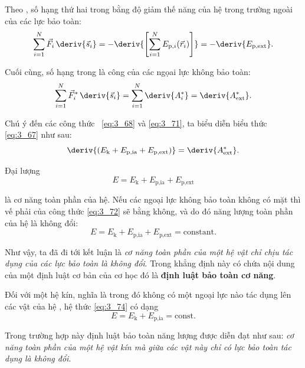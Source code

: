 \noindent
Theo , số hạng thứ hai trong  bằng độ giảm thế năng của hệ trong trường ngoài của các lực bảo toàn: 
\begin{equation}\label{eq:3_70}
\sum_{i=1}^{N}\vec{F}_i\,\deriv{\vec{s}_i} = -\deriv{\left[\sum_{i=1}^{N}E_{\text{p},i}(\vec{r}_i)\right]} = -\deriv{E_{\text{p,ext}}}.
\end{equation}

\noindent
Cuối cùng, số hạng trong   là công của các ngọai lực không bảo toàn:
\begin{equation}\label{eq:3_71}
\sum_{i=1}^{N}\vec{F}_i^*\,\deriv{\vec{s}_i} = \sum_{i=1}^{N} \deriv{A_i^*} = \deriv{A^*_{\text{ext}}}.
\end{equation}

\noindent
Chú ý đến các công thức ~\eqref{eq:3_68} và \eqref{eq:3_71}, ta biểu diễn biểu thức \eqref{eq:3_67} như sau: 
\begin{equation}\label{eq:3_72}
\deriv{(E_{\text{k}} + E_{\text{p,ia}} + E_{\text{p,ext}})} = \deriv{A^*_{\text{ext}}}.
\end{equation}

Đại lượng
\begin{equation}\label{eq:3_73}
E = E_{\text{k}} + E_{\text{p,ia}} + E_{\text{p,ext}}
\end{equation}

\noindent
là cơ năng toàn phần của hệ. Nếu các ngoại lực không bảo toàn không có mặt thì vế phải của công thức \eqref{eq:3_72} sẽ bằng không, và do đó năng lượng toàn phần của hệ là không đổi: 
\begin{equation}\label{eq:3_74}
E = E_{\text{k}} + E_{\text{p,ia}} + E_{\text{p,ext}} = \text{constant}.
\end{equation}

\noindent
Như vậy, ta đã đi tới kết luận là 
 \textit{cơ năng toàn phần của một hệ vật chỉ chịu tác dụng của các lực bảo toàn là không đổi}. Trong khẳng định này có chứa nội dung của một định luật cơ bản của cơ học đó là \textbf{định luật bảo toàn cơ năng}.

Đối với một hệ kín, nghĩa là trong đó không có một ngoại lực nào tác dụng lên các vật của hệ , hệ thức \eqref{eq:3_74} có dạng 
\begin{equation}\label{eq:3_75}
E = E_{\text{k}} + E_{\text{p,ia}} = \text{const}.
\end{equation}

\noindent
Trong trường hợp này định luật bảo toàn năng lượng được diễn đạt như sau: \textit{cơ năng toàn phần của một hệ vật kín mà giữa các vật này chỉ có lực bảo toàn tác dụng là không đổi}.

